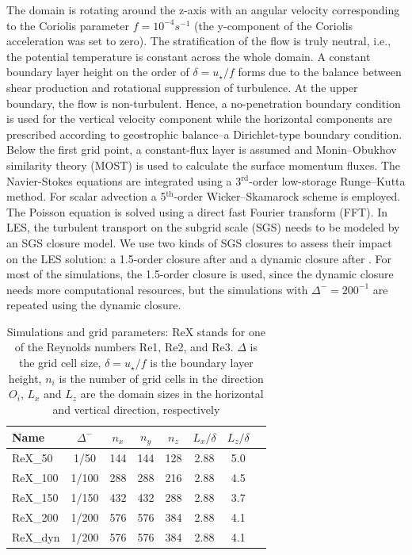 \documentclass[smallcondensed,draft]{svjour3}
\begin{document}
The domain is rotating around the z-axis with an angular velocity corresponding to the Coriolis parameter $f=10^{-4}s^{-1}$ (the y-component of the Coriolis acceleration was set to zero). The stratification of the flow is truly neutral, i.e., the potential temperature is constant across the whole domain. A constant boundary layer height on the order of $\delta=u_\star/f$ forms due to the balance between shear production and rotational suppression of turbulence. At the upper boundary, the flow is non-turbulent. Hence, a no-penetration boundary condition is used for the vertical velocity component while the horizontal components are prescribed according to geostrophic balance--a Dirichlet-type boundary condition. Below the first grid point, a constant-flux layer is assumed and Monin--Obukhov similarity theory (MOST) is used to calculate the surface momentum fluxes. The Navier-Stokes equations are integrated using a 3$^\text{rd}$-order low-storage Runge--Kutta method. For scalar advection a 5$^\text{th}$-order Wicker--Skamarock scheme is employed. The Poisson equation is solved using a direct fast Fourier transform (FFT). In LES, the turbulent transport on the subgrid scale (SGS) needs to be modeled by an SGS closure model. We use two kinds of SGS closures to assess their impact on the LES solution: a 1.5-order closure after \cite{deardorff1980stratocumulus} and a dynamic closure after \cite{heinz2008realizability}. For most of the simulations, the 1.5-order closure is used, since the dynamic closure needs more computational resources, but the simulations with $\Delta^-=200^{-1}$ are repeated using the dynamic closure.  

\begin{table}
	\centering
	\caption{Simulations and grid parameters: ReX stands for one of the Reynolds numbers Re1, Re2, and Re3. $\Delta$ is the grid cell size, $\delta=u_\star/f$ is the boundary layer height, $n_i$ is the number of grid cells in the direction $O_i$, $L_x$ and $L_z$ are the domain sizes in the horizontal and vertical direction, respectively}
	  \begin{tabular}{lccccccc}
          \toprule 
	    Name & $\Delta^-$ & $n_x$ & $n_y$ & $n_z$ & $L_x/\delta$ & $L_z/\delta$  \\ 
          \midrule
  	  ReX\_50 & 1/50 & 144 & 144 & 128 & 2.88 & 5.0 \\
  	  ReX\_100 & 1/100 & 288 & 288 & 216 & 2.88 & 4.5 \\
	    ReX\_150 & 1/150 & 432 & 432 & 288 & 2.88 & 3.7 \\
  	  ReX\_200 & 1/200 & 576 & 576 & 384 & 2.88 & 4.1 \\
  	  ReX\_dyn & 1/200 & 576 & 576 & 384 & 2.88 & 4.1 \\
           \bottomrule
		\end{tabular}
	\label{simulation_parameters2}
\end{table}
\end{document}
